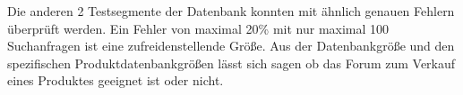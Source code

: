 Die anderen 2 Testsegmente der Datenbank konnten mit ähnlich genauen Fehlern überprüft werden.
Ein Fehler von maximal 20\% mit nur maximal 100 Suchanfragen ist eine zufreidenstellende Größe. Aus der Datenbankgröße und den spezifischen Produktdatenbankgrößen lässt sich sagen ob das Forum zum Verkauf eines Produktes geeignet ist oder nicht.
